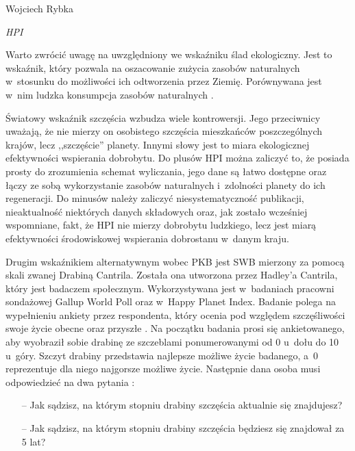 \begin{artplenv}{Wojciech Rybka}
\begin{footnotesize}
\begin{widerequation}
\textit{HPI}\ {\approx}\ 
\end{widerequation}
\end{footnotesize}

Warto zwrócić uwagę na uwzględniony we wskaźniku ślad ekologiczny. Jest to wskaźnik, który pozwala na oszacowanie
zużycia zasobów naturalnych w~stosunku do możliwości ich odtworzenia przez Ziemię. Porównywana jest w~nim ludzka
konsumpcja zasobów naturalnych
\parencite{noauthor_about_2019}.

Światowy wskaźnik szczęścia wzbudza wiele kontrowersji. Jego przeciwnicy uważają, że nie mierzy on osobistego szczęścia
mieszkańców poszczególnych krajów, lecz ,,szczęście'' planety. Innymi słowy jest to miara ekologicznej efektywności
wspierania dobrobytu. Do plusów HPI można zaliczyć to, że posiada prosty do zrozumienia schemat wyliczania, jego dane
są łatwo dostępne oraz łączy ze sobą wykorzystanie zasobów naturalnych i~zdolności planety do ich regeneracji. Do
minusów należy zaliczyć niesystematyczność publikacji, nieaktualność niektórych danych składowych oraz, jak zostało
wcześniej wspomniane, fakt, że HPI nie mierzy dobrobytu ludzkiego, lecz jest miarą efektywności środowiskowej wspierania
dobrostanu w~danym kraju. 

Drugim wskaźnikiem alternatywnym wobec PKB jest SWB mierzony za pomocą skali zwanej Drabiną Cantrila. Została ona
utworzona przez Hadley'a Cantrila, który jest badaczem społecznym. Wykorzystywana jest w~badaniach pracowni sondażowej
Gallup World Poll oraz w~Happy Planet Index. Badanie polega na wypełnieniu ankiety przez respondenta, który ocenia pod
względem szczęśliwości swoje życie obecne oraz przyszłe
\parencite{krok_metody_2016}.
Na początku badania
prosi się ankietowanego, aby wyobraził sobie drabinę ze szczeblami ponumerowanymi od 0 u~dołu do 10 u~góry. Szczyt
drabiny przedstawia najlepsze możliwe życie badanego, a~0 reprezentuje dla niego najgorsze możliwe życie. Następnie
dana osoba musi odpowiedzieć na dwa pytania
\parencite{gallup_inc._understanding_2019}:

\begin{itemize}
	\item[--] Jak sądzisz, na którym stopniu drabiny szczęścia aktualnie się znajdujesz?
	\item[--] Jak sądzisz, na którym stopniu drabiny szczęścia będziesz się znajdował za 5 lat?
\end{itemize}


\end{artplenv}
